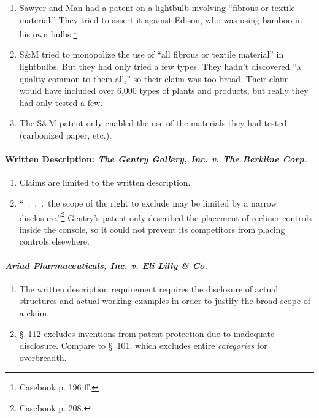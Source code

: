 \begin{enumerate}
    \item Sawyer and Man had a patent on a lightbulb involving ``fibrous or 
    textile material.'' They tried to assert it against Edison, who was using 
    bamboo in his own bulbs.\footnote{Casebook p. 196 ff.}
    \item S\&M tried to monopolize the use of ``all fibrous or textile 
    material'' in lightbulbs. But they had only tried a few types. They hadn't 
    discovered ``a quality common to them all,'' so their claim was too broad.  
    Their claim would have included over 6,000 types of plants and products, 
    but really they had only tested a few.
    \item The S\&M patent only enabled the use of the materials they had 
    tested (carbonized paper, etc.).
\end{enumerate}

\paragraph{Written Description: \emph{The Gentry Gallery, Inc. v. 
The Berkline Corp.}}

\begin{enumerate}
    \item Claims are limited to the written description.
    \item ``~.~.~.~the scope of the right to exclude may be limited by a 
    narrow disclosure.''\footnote{Casebook p. 208.} Gentry's patent only 
    described the placement of recliner controls inside the console, so it 
    could not prevent its competitors from placing controls elsewhere.
\end{enumerate}

\paragraph{\emph{Ariad Pharmaceuticals, Inc. v. Eli Lilly \& Co.}}

\begin{enumerate}
    \item The written description requirement requires the disclosure of 
    actual structures and actual working examples in order to justify the 
    broad scope of a claim.
    \item \S\ 112 excludes inventions from patent protection due to inadequate 
    disclosure. Compare to \S\ 101, which excludes entire \emph{categories} 
    for overbreadth.
\end{enumerate}

